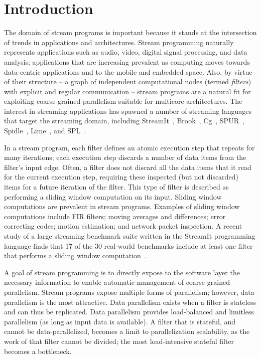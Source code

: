\section{Introduction}

The domain of stream programs is important because it stands at the
intersection of trends in applications and architectures.  Stream
programming naturally represents applications such as audio, video,
digital signal processing, and data analysis; applications that are
increasing prevalent as computing moves towards data-centric
applications and to the mobile and embedded space.  Also, by virtue of
their structure -- a graph of independent computational nodes (termed
{\it filters}) with explicit and regular communication -- stream
programs are a natural fit for exploiting coarse-grained parallelism
suitable for multicore architectures.  The interest in streaming
applications has spawned a number of streaming languages that target
the streaming domain, including StreamIt~\cite{streamitcc},
Brook~\cite{brook04}, Cg~\cite{cg03},
SPUR~\cite{spur05samos}, Spidle~\cite{spidle03}, Lime~\cite{lime10},
and SPL~\cite{spl09}.

In a stream program, each filter defines an atomic execution step that
repeats for many iterations; each execution step discards a number of
data items from the filter's input edge.  Often, a filter does not
discard all the data items that it read for the current execution
step, requiring these inspected (but not discarded) items for a future
iteration of the filter.  This type of filter is described as
performing a sliding window computation on its input. Sliding window
computations are prevalent in stream programs.  Examples of sliding
window computations include FIR filters; moving averages and
differences; error correcting codes; motion estimation; and network
packet inspection.  A recent study of a large streaming benchmark
suite written in the StreamIt programming language finds that 17 of
the 30 real-world benchmarks include at least one filter that performs
a sliding window computation~\cite{streamit-suite}.

A goal of stream programming is to directly expose to the software
layer the necessary information to enable automatic management of
coarse-grained parallelism.  Stream programs expose multiple forms of
parallelism; however, data parallelism is the most attractive.  Data
parallelism exists when a filter is stateless and can thus be
replicated.  Data parallelism provides load-balanced and limitless
parallelism (as long as input data is available).  A filter that is
stateful, and cannot be data-parallelized, becomes a limit to
parallelization scalability, as the work of that filter cannot be
divided; the most load-intensive stateful filter becomes a bottleneck.

